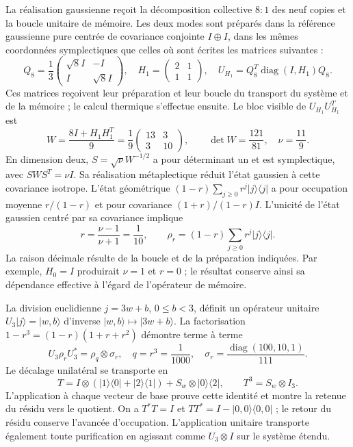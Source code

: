La réalisation gaussienne reçoit la décomposition collective $8:1$ des
neuf copies et la boucle unitaire de mémoire. Les deux modes sont préparés
dans la référence gaussienne pure centrée de covariance conjointe $I\oplus I$,
dans les mêmes coordonnées symplectiques que celles où sont écrites les matrices
suivantes :
\[
 Q_8=\frac13\begin{pmatrix}\sqrt8 I&-I\\ I&\sqrt8 I\end{pmatrix},
 \quad H_1=\begin{pmatrix}2&1\\1&1\end{pmatrix},
 \quad U_{H_1}=Q_8^T\operatorname{diag}(I,H_1)Q_8.
\]
Ces matrices reçoivent leur préparation et leur boucle du transport du
système et de la mémoire ; le calcul thermique s’effectue ensuite. Le bloc
visible de $U_{H_1}U_{H_1}^T$ est
\[
 W=\frac{8I+H_1H_1^T}{9}
 =\frac19\begin{pmatrix}13&3\\3&10\end{pmatrix},
 \qquad \det W=\frac{121}{81},\quad \nu=\frac{11}{9}.
\]
En dimension deux, $S=\sqrt\nu W^{-1/2}$ a pour déterminant un et est
symplectique, avec $SWS^T=\nu I$. Sa réalisation métaplectique réduit
l’état gaussien à cette covariance isotrope. L’état géométrique
$(1-r)\sum_{j\geq0}r^j|j\rangle\langle j|$ a pour occupation moyenne
$r/(1-r)$ et pour covariance $(1+r)/(1-r)I$. L’unicité de l’état gaussien
centré par sa covariance implique
\begin{equation}
 r=\frac{\nu-1}{\nu+1}=\frac1{10},\qquad
 \rho_r=(1-r)\sum_{j\geq0}r^j|j\rangle\langle j|.
 \label{eq:ii-ter27-williamson}
\end{equation}
La raison décimale résulte de la boucle et de la préparation indiquées. Par
exemple, $H_0=I$ produirait $\nu=1$ et $r=0$ ; le résultat conserve
ainsi sa dépendance effective à l’égard de l’opérateur de mémoire.

La division euclidienne $j=3w+b$, $0\leq b<3$, définit un opérateur unitaire
$U_3|j\rangle=|w,b\rangle$ d’inverse $|w,b\rangle\mapsto|3w+b\rangle$.
La factorisation $1-r^3=(1-r)(1+r+r^2)$ démontre terme à terme
\begin{equation}
 U_3\rho_rU_3^*=\rho_q\otimes\sigma_r,
 \quad q=r^3=\frac1{1000},\quad
 \sigma_r=\frac{\operatorname{diag}(100,10,1)}{111}.
 \label{eq:ii-ter27-agrupamiento}
\end{equation}
Le décalage unilatéral se transporte en
\[
 T=I\otimes(|1\rangle\langle0|+|2\rangle\langle1|)
       +S_w\otimes|0\rangle\langle2|,\qquad T^3=S_w\otimes I_3.
\]
L’application à chaque vecteur de base prouve cette identité et montre la
retenue du résidu vers le quotient. On a $T^*T=I$ et
$TT^*=I-|0,0\rangle\langle0,0|$ ; le retour du résidu conserve
l’avancée d’occupation. L’application unitaire transporte également toute purification
en agissant comme $U_3\otimes I$ sur le système étendu.

